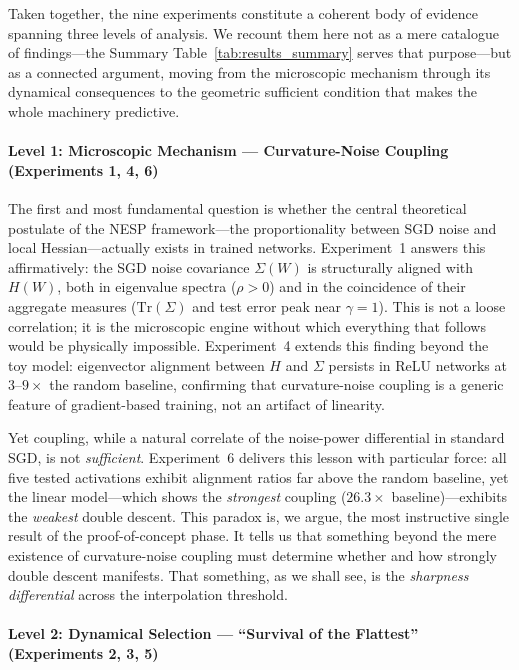 \documentclass[
  journal=largetwo,
  simfonts=false,
  year=2025,
  volume=37,
]{cup-journal}
\begin{document}
Taken together, the nine experiments constitute a coherent body of evidence spanning three levels of analysis. We recount them here not as a mere catalogue of findings---the Summary Table~\ref{tab:results_summary} serves that purpose---but as a connected argument, moving from the microscopic mechanism through its dynamical consequences to the geometric sufficient condition that makes the whole machinery predictive.

\paragraph{Level 1: Microscopic Mechanism --- Curvature-Noise Coupling (Experiments 1, 4, 6)}

The first and most fundamental question is whether the central theoretical postulate of the NESP framework---the proportionality between SGD noise and local Hessian---actually exists in trained networks. Experiment~1 answers this affirmatively: the SGD noise covariance $\Sigma(W)$ is structurally aligned with $H(W)$, both in eigenvalue spectra ($\rho > 0$) and in the coincidence of their aggregate measures ($\mathrm{Tr}(\Sigma)$ and test error peak near $\gamma = 1$). This is not a loose correlation; it is the microscopic engine without which everything that follows would be physically impossible. Experiment~4 extends this finding beyond the toy model: eigenvector alignment between $H$ and $\Sigma$ persists in ReLU networks at $3$--$9\times$ the random baseline, confirming that curvature-noise coupling is a generic feature of gradient-based training, not an artifact of linearity.

Yet coupling, while a natural correlate of the noise-power differential in standard SGD, is not \textit{sufficient}. Experiment~6 delivers this lesson with particular force: all five tested activations exhibit alignment ratios far above the random baseline, yet the linear model---which shows the \textit{strongest} coupling ($26.3\times$ baseline)---exhibits the \textit{weakest} double descent. This paradox is, we argue, the most instructive single result of the proof-of-concept phase. It tells us that something beyond the mere existence of curvature-noise coupling must determine whether and how strongly double descent manifests. That something, as we shall see, is the \textit{sharpness differential} across the interpolation threshold.

\paragraph{Level 2: Dynamical Selection --- ``Survival of the Flattest'' (Experiments 2, 3, 5)}
\end{document}
